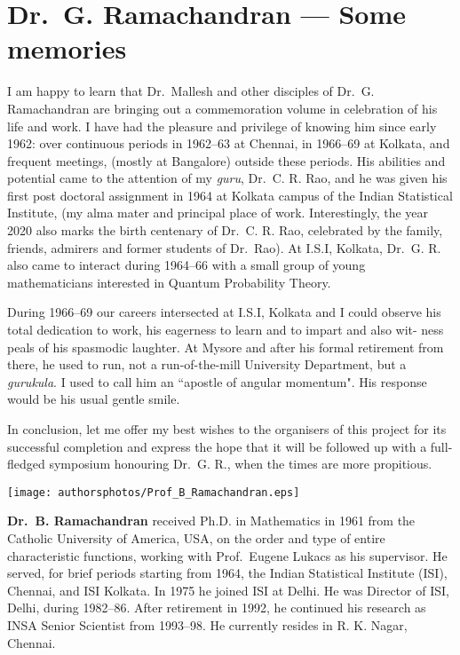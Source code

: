 \chapter{Dr.\ G. Ramachandran --- Some memories}\label{chap10}



I am happy to learn that Dr.\ Mallesh and other disciples of Dr.\ G. Ramachandran are bringing out a commemoration volume in celebration of his life
and work. I have had the pleasure and privilege of knowing him since early
1962: over continuous periods in 1962--63 at Chennai, in 1966--69 at Kolkata,
and frequent meetings, (mostly at Bangalore) outside these periods. His abilities and potential came 
to the attention of my \textit{guru}, Dr.\ C. R. Rao, and he was
given his first post doctoral assignment in 1964 at Kolkata campus of the Indian
Statistical Institute, (my alma mater and principal place of work. Interestingly,
the year 2020 also marks the birth centenary of Dr.\ C. R. Rao, celebrated by
the family, friends, admirers and former students of Dr.\ Rao). At I.S.I, Kolkata,
Dr.\ G. R. also came to interact during 1964--66 with a small group of young
mathematicians interested in Quantum Probability Theory.

During 1966--69 our careers intersected at I.S.I, Kolkata and I could observe
his total dedication to work, his eagerness to learn and to impart and also wit-
ness peals of his spasmodic laughter. At Mysore and after his formal retirement
from there, he used to run, not a run-of-the-mill University Department, but a
\textit{gurukula}. I used to call him an ``apostle of angular momentum". His response
would be his usual gentle smile.


In conclusion, let me offer my best wishes to the organisers of this project
for its successful completion and express the hope that it will be followed up
with a full-fledged symposium honouring Dr.\ G. R., when the times are more
propitious.

\centerline{\texttt{[image: authorsphotos/Prof\_B\_Ramachandran.eps]}}
\smallskip

\bigskip

\noindent
\textbf{Dr.\ B. Ramachandran} received Ph.D. in Mathematics in 1961 from the Catholic University of America, 
USA, on the order and type of entire characteristic functions, working with 
Prof.\ Eugene Lukacs as his supervisor. He served, for brief periods starting from 1964, the Indian 
Statistical Institute (ISI), Chennai, and ISI Kolkata. In 1975 he joined ISI at Delhi. He was Director of 
ISI, Delhi, during 1982--86. After retirement in 1992, he continued his research as INSA Senior Scientist 
from 1993--98. He currently resides in R. K. Nagar, Chennai.
